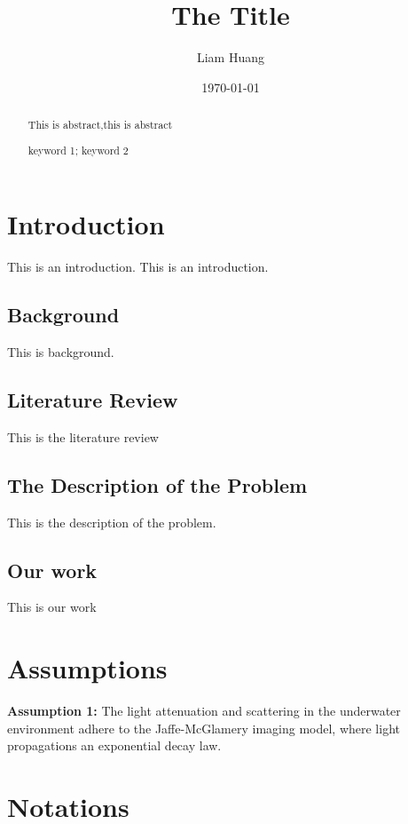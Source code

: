 \documentclass{mcmthesis}
\title{The Title}
\author{Liam Huang}
\date{\today}
\begin{document}
\begin{abstract}
This is abstract,this is abstract           %
\begin{keywords}
keyword 1; keyword 2
\end{keywords}

\end{abstract}

\maketitle                  %
\tableofcontents %
\newpage
\section{Introduction}
\label{sec:introduction}
This is an introduction.
This is an introduction.
\subsection{Background}
This is background.



\subsection{Literature Review}
This is the literature review



\subsection{The Description of the Problem}
This is the description of the problem.




\subsection{Our work}
This is our work     
\section{Assumptions}


\textbf{Assumption 1:} The light attenuation and scattering in the underwater environment adhere to the Jaffe-McGlamery imaging model, where light propagations an exponential decay law.

\newpage
\section{Notations}
\setlength{\parindent}{2em} %
\end{document}
